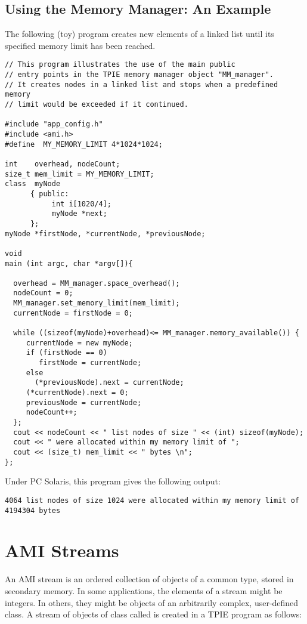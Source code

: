 \subsection{Using the Memory Manager: An Example}

The following (toy) program creates new elements of a linked
list until its specified memory limit has been reached.

\begin{verbatim}
// This program illustrates the use of the main public 
// entry points in the TPIE memory manager object "MM_manager".
// It creates nodes in a linked list and stops when a predefined memory 
// limit would be exceeded if it continued.

#include "app_config.h"
#include <ami.h>
#define  MY_MEMORY_LIMIT 4*1024*1024;

int    overhead, nodeCount;
size_t mem_limit = MY_MEMORY_LIMIT;
class  myNode 
      { public:
           int i[1020/4];
           myNode *next;
      };
myNode *firstNode, *currentNode, *previousNode;

void 
main (int argc, char *argv[]){

  overhead = MM_manager.space_overhead();
  nodeCount = 0;
  MM_manager.set_memory_limit(mem_limit);
  currentNode = firstNode = 0;

  while ((sizeof(myNode)+overhead)<= MM_manager.memory_available()) { 
     currentNode = new myNode;
     if (firstNode == 0) 
        firstNode = currentNode;
     else
       (*previousNode).next = currentNode;
     (*currentNode).next = 0;
     previousNode = currentNode;
     nodeCount++;
  };
  cout << nodeCount << " list nodes of size " << (int) sizeof(myNode); 
  cout << " were allocated within my memory limit of ";
  cout << (size_t) mem_limit << " bytes \n";
};
\end{verbatim}

Under PC Solaris, this program gives the following output:
\begin{verbatim}
4064 list nodes of size 1024 were allocated within my memory limit of 4194304 bytes
\end{verbatim}


\section{AMI Streams}

\tobeextended
{}
An AMI stream is an ordered collection of objects of a
common type,  stored in secondary memory.  In some
applications, the elements of a stream might be integers.
In others, they might be objects of an arbitrarily complex, user-defined
class.  A stream of objects of class  called
 is created in a TPIE program as follows:

